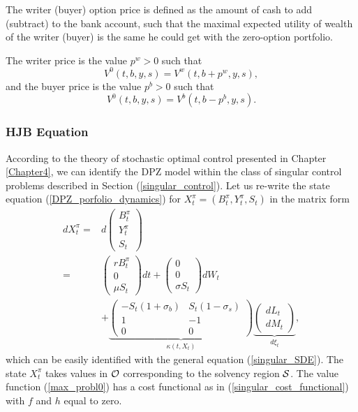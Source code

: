 The writer (buyer) option price is defined as the amount of cash to add (subtract) to the bank account, 
such that the maximal expected utility of wealth of the writer (buyer) is the same he could get with 
the zero-option portfolio.
\begin{Definition}
The writer price is the value $p^w>0$ such that 
 \begin{equation}\label{writer}
  V^0(t,b,y,s) = V^w(t,b+p^w,y,s),
 \end{equation}
 and the buyer price is the value $p^b>0$ such that
 \begin{equation}\label{buyer}
  V^0(t,b,y,s) = V^b(t,b-p^b,y,s).
 \end{equation}
\end{Definition}


\subsubsection{HJB Equation}\label{subsec_HJB}

According to the theory of stochastic optimal control presented in Chapter \ref{Chapter4},  
we can identify the DPZ model within the class of singular control problems described in Section (\ref{singular_control}).
Let us re-write the state equation (\ref{DPZ_porfolio_dynamics}) for $X^{\pi}_t = (B^{\pi}_t,Y^{\pi}_t,S_t)$ in the matrix form 
\begin{align}\label{DPZ_porfolio_dynamicsM}
d X^{\pi}_t
=& 
 d \left(
\begin{array}{l}
B^{\pi}_t\\
Y^{\pi}_t\\
S_t
\end{array} \right) \\ \nonumber
  =&  \left( \begin{array}{l}
r B^{\pi}_t\\
0\\
\mu S_{t}
\end{array} \right)
dt +  \left( \begin{array}{l}
0\\
0\\
\sigma S_{t}
\end{array} \right) dW_t \\ \nonumber
&+ \underbrace{\left( \begin{array}{cc}
-S_{t}(1+\sigma_b) & S_{t}(1-\sigma_s) \\
1 & -1 \\
0 & 0
\end{array} \right)}_{\kappa(t,X_t)}
\underbrace{\left( \begin{array}{l}
dL_t \\
dM_t 
\end{array} \right)}_{d\xi_t},
\end{align}
which can be easily identified with the general equation (\ref{singular_SDE}).
The state $X^{\pi}_t$ takes values in $\mathcal{O}$ corresponding to the solvency region $\mathcal{S}$.
The value function (\ref{max_probl0}) has a cost functional as in (\ref{singular_cost_functional}) with $f$ and $h$ equal to zero. 


